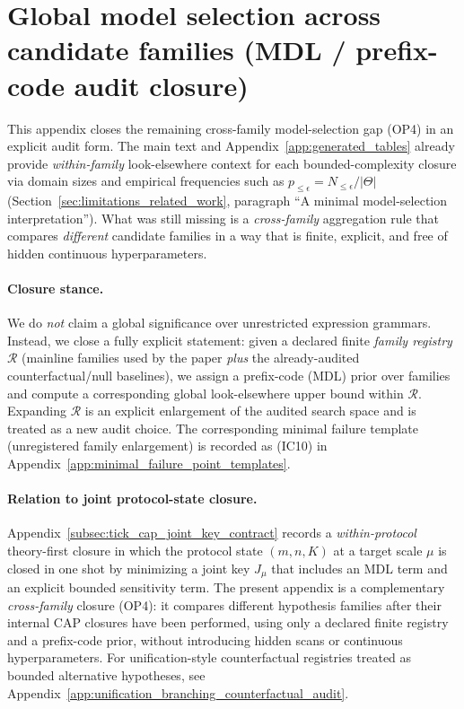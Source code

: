 \section{Global model selection across candidate families (MDL / prefix-code audit closure)}
\label{app:global_model_selection_mdl}

This appendix closes the remaining cross-family model-selection gap (OP4) in an explicit audit form.
The main text and Appendix~\ref{app:generated_tables} already provide \emph{within-family} look-elsewhere context for each bounded-complexity closure via domain sizes and empirical frequencies such as $p_{\le\epsilon}=N_{\le\epsilon}/|\Theta|$ (Section~\ref{sec:limitations_related_work}, paragraph ``A minimal model-selection interpretation'').
What was still missing is a \emph{cross-family} aggregation rule that compares \emph{different} candidate families in a way that is finite, explicit, and free of hidden continuous hyperparameters.

\paragraph{Closure stance.}
We do \emph{not} claim a global significance over unrestricted expression grammars.
Instead, we close a fully explicit statement:
given a declared finite \emph{family registry} $\mathcal{R}$ (mainline families used by the paper \emph{plus} the already-audited counterfactual/null baselines), we assign a prefix-code (MDL) prior over families \cite{Rissanen1978MDL,HansenYu2001MDL} and compute a corresponding global look-elsewhere upper bound within $\mathcal{R}$.
Expanding $\mathcal{R}$ is an explicit enlargement of the audited search space and is treated as a new audit choice.
\AuditTag The corresponding minimal failure template (unregistered family enlargement) is recorded as (IC10) in Appendix~\ref{app:minimal_failure_point_templates}.

\paragraph{Relation to joint protocol-state closure.}
\AuditTag Appendix~\ref{subsec:tick_cap_joint_key_contract} records a \emph{within-protocol} theory-first closure in which the protocol state $(m,n,K)$ at a target scale $\mu$ is closed in one shot by minimizing a joint key $J_\mu$ that includes an MDL term and an explicit bounded sensitivity term.
The present appendix is a complementary \emph{cross-family} closure (OP4): it compares different hypothesis families after their internal CAP closures have been performed, using only a declared finite registry and a prefix-code prior, without introducing hidden scans or continuous hyperparameters.
\AuditTag For unification-style counterfactual registries treated as bounded alternative hypotheses, see Appendix~\ref{app:unification_branching_counterfactual_audit}.

